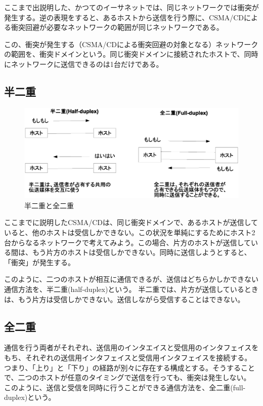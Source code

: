 ここまで出説明した、かつてのイーサネットでは、同じネットワークでは衝突が発生する。逆の表現をすると、あるホストから送信を行う際に、CSMA/CDによる衝突回避が必要なネットワークの範囲が同じネットワークである。

この、衝突が発生する（CSMA/CDによる衝突回避の対象となる）ネットワークの範囲を、衝突ドメインという。同じ衝突ドメインに接続されたホストで、同時にネットワークに送信できるのは1台だけである。


\subsection{半二重}

\begin{figure}[htbp]
	\includegraphics[width=12cm,clip]{draw/duplex.eps}
	\caption{半二重と全二重}
	\label{fig:duplex}
\end{figure}

ここまでに説明したCSMA/CDは、同じ衝突ドメインで、あるホストが送信していると、他のホストは受信しかできない。この状況を単純にするためにホスト2台からなるネットワークで考えてみよう。この場合、片方のホストが送信している間は、もう片方のホストは受信しかできない。同時に送信しようとすると、「衝突」が発生する。

このように、二つのホストが相互に通信できるが、送信はどちらかしかできない通信方法を、半二重(half-duplex)という。
半二重では、片方が送信しているときは、もう片方は受信しかできない。送信しながら受信することはできない。

\subsection{全二重}

通信を行う両者がそれぞれ、送信用のインタエイスと受信用のインタフェイスをもち、それぞれの送信用インタフェイスと受信用インタフェイスを接続する。
つまり、「上り」と「下り」の経路が別々に存在する構成とする。そうすることで、二つのホストが任意のタイミングで送信を行っても、衝突は発生しない。
このように、送信と受信を同時に行うことができる通信方法を、全二重(full-duplex)という。

